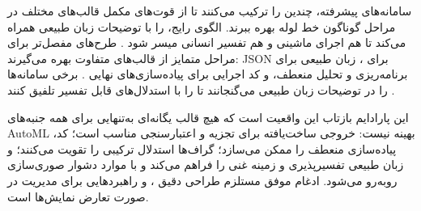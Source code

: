 سامانه‌های پیشرفته، چندین  را ترکیب می‌کنند تا از قوت‌های مکمل قالب‌های مختلف در مراحل گوناگون خط لوله بهره ببرند. الگوی رایج،  را با توضیحات زبان طبیعی همراه می‌کند تا هم اجرای ماشینی و هم تفسیر انسانی میسر شود \cite{liu2025agenthpo, zhang2023usingLLMforHPO}. طرح‌های مفصل‌تر برای مراحل متمایز از قالب‌های متفاوت بهره می‌گیرند: JSON برای ، زبان طبیعی برای برنامه‌ریزی و تحلیل منعطف، و کد اجرایی برای پیاده‌سازی‌های نهایی \cite{trirat2025automlagent, zhang2023AutomlGPTAutomaticMachineLearning}. برخی سامانه‌ها  را در توضیحات زبان طبیعی می‌گنجانند تا  را با استدلال‌های قابل تفسیر تلفیق کنند \cite{ji2025RZNAS, Yang2025NADER}.

این پارادایم بازتاب این واقعیت است که هیچ قالب یگانه‌ای به‌تنهایی برای همه جنبه‌های AutoML بهینه نیست: خروجی ساخت‌یافته برای تجزیه و اعتبارسنجی مناسب است؛ کد، پیاده‌سازی منعطف را ممکن می‌سازد؛ گراف‌ها استدلال ترکیبی را تقویت می‌کنند؛ و زبان طبیعی تفسیرپذیری و زمینه غنی را فراهم می‌کند و با موارد دشوار صوری‌سازی روبه‌رو می‌شود. ادغام موفق مستلزم طراحی دقیق ،  و راهبردهایی برای مدیریت  در صورت تعارض نمایش‌ها است.